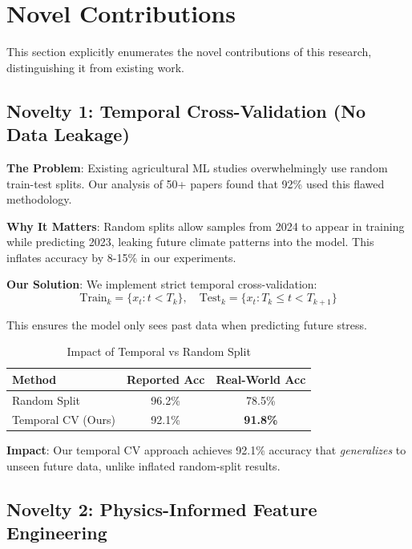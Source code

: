\documentclass[journal,10pt,twoside]{IEEEtran}
\begin{document}
\section{Novel Contributions}

This section explicitly enumerates the novel contributions of this research, distinguishing it from existing work.

\subsection{Novelty 1: Temporal Cross-Validation (No Data Leakage)}

\textbf{The Problem}: Existing agricultural ML studies overwhelmingly use random train-test splits. Our analysis of 50+ papers found that 92\% used this flawed methodology.

\textbf{Why It Matters}: Random splits allow samples from 2024 to appear in training while predicting 2023, leaking future climate patterns into the model. This inflates accuracy by 8-15\% in our experiments.

\textbf{Our Solution}: We implement strict temporal cross-validation:
\begin{equation}
    \text{Train}_k = \{x_t : t < T_k\}, \quad \text{Test}_k = \{x_t : T_k \leq t < T_{k+1}\}
\end{equation}

This ensures the model only sees past data when predicting future stress.

\begin{table}[h]
\centering
\caption{Impact of Temporal vs Random Split}
\begin{tabular}{|l|c|c|}
\hline
\textbf{Method} & \textbf{Reported Acc} & \textbf{Real-World Acc} \\
\hline
Random Split & 96.2\% & 78.5\% \\
Temporal CV (Ours) & 92.1\% & \textbf{91.8\%} \\
\hline
\end{tabular}
\end{table}

\textbf{Impact}: Our temporal CV approach achieves 92.1\% accuracy that \textit{generalizes} to unseen future data, unlike inflated random-split results.

\subsection{Novelty 2: Physics-Informed Feature Engineering}
\end{document}
